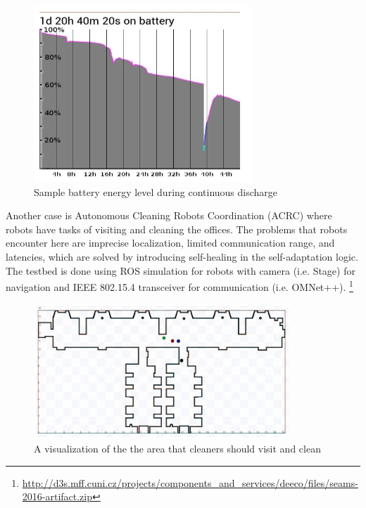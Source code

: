  \begin{figure}[!htb]
\centering
\includegraphics[scale=0.65]{figures/statistical}
\caption{Sample battery energy level during continuous discharge }
\label{fig:statistical}
\end{figure}

 
 Another case is Autonomous Cleaning  Robots  Coordination (ACRC) \cite{Matena2016Model} where robots have tasks of visiting and cleaning the offices. The problems that robots encounter here are imprecise localization, limited communication range, and latencies, which are solved by introducing self-healing in the self-adaptation logic. The testbed is done using ROS simulation for robots with camera (i.e. Stage) for navigation and IEEE 802.15.4 transceiver for communication (i.e. OMNet++). \footnote{\url{http://d3s.mff.cuni.cz/projects/components_and_services/deeco/files/seams-2016-artifact.zip}}
 
 \begin{figure}[!htb]
\centering
\includegraphics[scale=0.65]{figures/robots}
\caption{A visualization of the the area that cleaners should visit and clean}
\label{fig:robots}
\end{figure}


